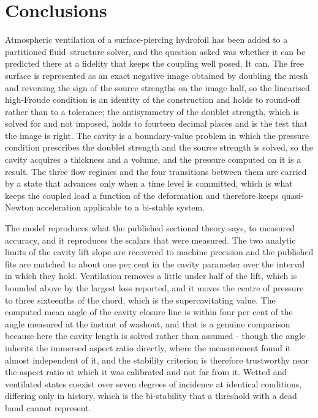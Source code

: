 \documentclass[11pt,a4paper]{article}
\begin{document}
\section{Conclusions}
\label{sec:Conclusions}

Atmospheric ventilation of a surface-piercing hydrofoil has been added to a
partitioned fluid--structure solver, and the question asked was whether it can be
predicted there at a fidelity that keeps the coupling well posed. It can. The
free surface is represented as an exact negative image obtained by doubling the
mesh and reversing the sign of the source strengths on the image half, so the
linearised high-Froude condition is an identity of the construction and holds to
round-off rather than to a tolerance; the antisymmetry of the doublet strength,
which is solved for and not imposed, holds to fourteen decimal places and is the
test that the image is right. The cavity is a boundary-value problem in which the
pressure condition prescribes the doublet strength and the source strength is
solved, so the cavity acquires a thickness and a volume, and the pressure
computed on it is a result. The three flow regimes and the four transitions
between them are carried by a state that advances only when a time level is
committed, which is what keeps the coupled load a function of the deformation and
therefore keeps quasi-Newton acceleration applicable to a bi-stable system.

The model reproduces what the published sectional theory says, to measured
accuracy, and it reproduces the scalars that were measured. The two analytic
limits of the cavity lift slope are recovered to machine precision and the
published fits are matched to about one per cent in the cavity parameter over the
interval in which they hold. Ventilation removes a little under half of the lift,
which is bounded above by the largest loss reported, and it moves the centre of
pressure to three sixteenths of the chord, which is the supercavitating value.
The computed mean angle of the cavity closure line is within four per cent of the
angle measured at the instant of washout, and that is a genuine comparison
because here the cavity length is solved rather than assumed - though the angle
inherits the immersed aspect ratio directly, where the measurement found it almost
independent of it, and the stability criterion is therefore trustworthy near the
aspect ratio at which it was calibrated and not far from it. Wetted and
ventilated states coexist over seven degrees of incidence at identical
conditions, differing only in history, which is the bi-stability that a threshold
with a dead band cannot represent.
\end{document}
